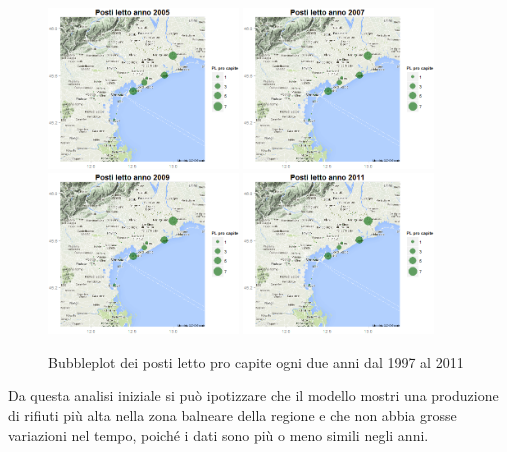 \documentclass[a4paper,11pt,twoside,openright]{book}							%
\begin{document}
\begin{figure}[H]
	\includegraphics[trim=0cm 0cm 0cm 0cm,clip=true,width=0.45\textwidth]{Immagini/venezia_dati/PL2005.png}
	\includegraphics[trim=0cm 0cm 0cm 0cm,clip=true,width=0.45\textwidth]{Immagini/venezia_dati/PL2007.png}
	\includegraphics[trim=0cm 0cm 0cm 0cm,clip=true,width=0.45\textwidth]{Immagini/venezia_dati/PL2009.png}
	\includegraphics[trim=0cm 0cm 0cm 0cm,clip=true,width=0.45\textwidth]{Immagini/venezia_dati/PL2011.png}
	\caption{Bubbleplot dei posti letto pro capite ogni due anni dal 1997 al 2011}
	\label{fig:Ven_bubblePL}
\end{figure}
\newpage
Da questa analisi iniziale si può ipotizzare che il modello mostri una produzione di rifiuti più alta nella zona balneare della regione e che non abbia grosse variazioni nel tempo, poiché i dati sono più o meno simili negli anni. 
\end{document}

